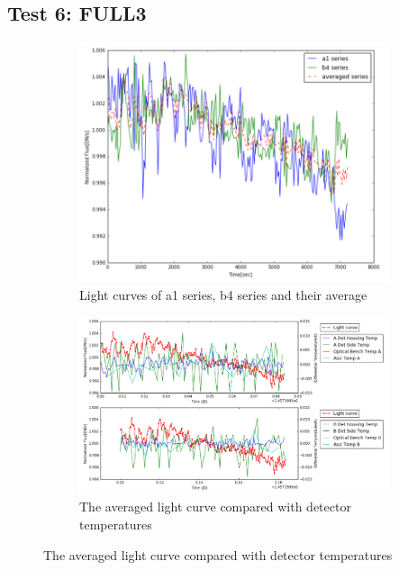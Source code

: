 \documentclass[conference]{IEEEtran}
\begin{document}
\subsection{Test 6: FULL3} 
\begin{figure}[H]
    \centering
    \begin{subfigure}{1}
        \includegraphics[scale=0.4]{ts_test6}
        \caption{Light curves of a1 series, b4 series and their average}
    \end{subfigure}

    \begin{subfigure}{2}
        \includegraphics[scale=0.4]{temp_test6}
        \caption{The averaged light curve compared with detector temperatures}
    \end{subfigure}
   

\end{figure}
\end{document}
